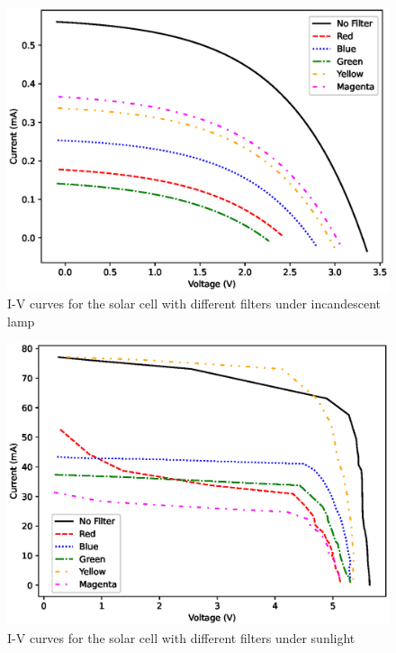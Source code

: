 \begin{figure}[H]
        \centering
        \includegraphics[width=1\columnwidth]{images/in/iv.eps}
    \caption{I-V curves for the solar cell with different filters under incandescent lamp}
\end{figure}

\begin{figure}
        \centering
        \includegraphics[width=1\columnwidth]{images/out/iv.eps}
    \caption{I-V curves for the solar cell with different filters under sunlight}
\end{figure}

